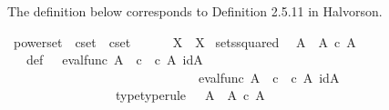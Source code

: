 \begin{isabellebody}
\endisatagproof
{\isafoldproof}%
%
\isadelimproof
%
\endisadelimproof
%
\begin{isamarkuptext}%
The definition below corresponds to Definition 2.5.11 in Halvorson.%
\end{isamarkuptext}\isamarkuptrue%
\isamarkupfalse%
\ powerset\ {\isacharcolon}{\kern0pt}{\isacharcolon}{\kern0pt}\ {\isachardoublequoteopen}cset\ {\isasymRightarrow}\ cset{\isachardoublequoteclose}\ {\isacharparenleft}{\kern0pt}{\isachardoublequoteopen}{\isasymP}{\isacharunderscore}{\kern0pt}{\isachardoublequoteclose}\ {\isacharbrackleft}{\kern0pt}{}{}{}{\isacharbrackright}{\kern0pt}{}{}{}{\isacharparenright}{\kern0pt}\ \isanewline
\ \ {\isachardoublequoteopen}{\isasymP}\ X\ {\isacharequal}{\kern0pt}\ {\isasymOmega}\isactrlbsup X\isactrlesup {\isachardoublequoteclose}\isanewline
\isanewline
{}\isamarkupfalse%
\ sets{\isacharunderscore}{\kern0pt}squared{\isacharcolon}{\kern0pt}\isanewline
\ \ {\isachardoublequoteopen}A\isactrlbsup {\isasymOmega}\isactrlesup \ {\isasymcong}\ A\ {\isasymtimes}\isactrlsub c\ A{\isachardoublequoteclose}\isanewline
%
\isadelimproof
%
\endisadelimproof
%
\isatagproof
{}\isamarkupfalse%
\ {\isacharminus}{\kern0pt}\ \isanewline
\ \ \isamarkupfalse%
\ {\isasymphi}\ \ {\isasymphi}{\isacharunderscore}{\kern0pt}def{\isacharcolon}{\kern0pt}\ {\isachardoublequoteopen}{\isasymphi}\ {\isacharequal}{\kern0pt}\ {\isasymlangle}eval{\isacharunderscore}{\kern0pt}func\ A\ {\isasymOmega}\ {\isasymcirc}\isactrlsub c\ {\isasymlangle}{\isasymt}\ {\isasymcirc}\isactrlsub c\ {\isasymbeta}\isactrlbsub A\isactrlbsup {\isasymOmega}\isactrlesup \isactrlesub {\isacharcomma}{\kern0pt}\ id{\isacharparenleft}{\kern0pt}A\isactrlbsup {\isasymOmega}\isactrlesup {\isacharparenright}{\kern0pt}{\isasymrangle}{\isacharcomma}{\kern0pt}\isanewline
\ \ \ \ \ \ \ \ \ \ \ \ \ \ \ \ \ \ \ \ \ \ \ \ \ \ \ \ \ \ eval{\isacharunderscore}{\kern0pt}func\ A\ {\isasymOmega}\ {\isasymcirc}\isactrlsub c\ {\isasymlangle}{\isasymf}\ {\isasymcirc}\isactrlsub c\ {\isasymbeta}\isactrlbsub A\isactrlbsup {\isasymOmega}\isactrlesup \isactrlesub {\isacharcomma}{\kern0pt}\ id{\isacharparenleft}{\kern0pt}A\isactrlbsup {\isasymOmega}\isactrlesup {\isacharparenright}{\kern0pt}{\isasymrangle}{\isasymrangle}{\isachardoublequoteclose}\ \isanewline
\ \ \ \ \ \ \ \ \ \ \ \ \ \ \ \ \ {\isasymphi}{\isacharunderscore}{\kern0pt}type{\isacharbrackleft}{\kern0pt}type{\isacharunderscore}{\kern0pt}rule{\isacharbrackright}{\kern0pt}{\isacharcolon}{\kern0pt}\ {\isachardoublequoteopen}{\isasymphi}\ {\isacharcolon}{\kern0pt}\ A\isactrlbsup {\isasymOmega}\isactrlesup \ {\isasymrightarrow}\ A\ {\isasymtimes}\isactrlsub c\ A{\isachardoublequoteclose}\isanewline

\end{isabellebody}
